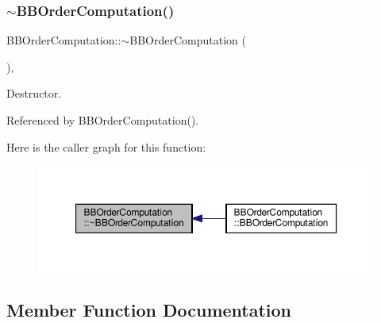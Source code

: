 \subsubsection{\texorpdfstring{$\sim$\+B\+B\+Order\+Computation()}{~BBOrderComputation()}}
{\footnotesize\ttfamily B\+B\+Order\+Computation\+::$\sim$\+B\+B\+Order\+Computation (\begin{DoxyParamCaption}{ }\end{DoxyParamCaption})\hspace{0.3cm}{\ttfamily [override]}, {\ttfamily [default]}}



Destructor. 



Referenced by B\+B\+Order\+Computation().

Here is the caller graph for this function\+:
\nopagebreak
\begin{figure}[H]
\begin{center}
\leavevmode
\includegraphics[width=350pt]{d4/d8e/classBBOrderComputation_a5e70c82b7679fe0adc6306821f5c9d8c_icgraph}
\end{center}
\end{figure}


\subsection{Member Function Documentation}
\mbox{\label{classBBOrderComputation_a1cdada91e19bdbec7dc8da77c52ee446}} 
